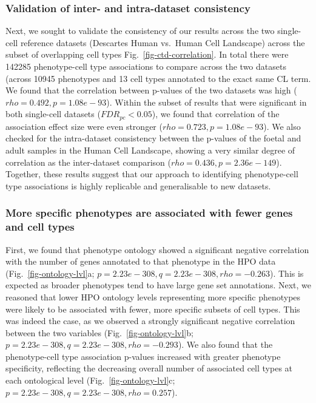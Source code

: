 \documentclass[
]{agujournal2019}
\begin{document}
\subsubsection{Validation of inter- and intra-dataset
consistency}\label{validation-of-inter--and-intra-dataset-consistency}

Next, we sought to validate the consistency of our results across the
two single-cell reference datasets (Descartes Human vs.~Human Cell
Landscape) across the subset of overlapping cell types
Fig.~\ref{fig-ctd-correlation}. In total there were 142285
phenotype-cell type associations to compare across the two datasets
(across 10945 phenotypes and 13 cell types annotated to the exact same
CL term. We found that the correlation between p-values of the two
datasets was high (\(rho=0.492, p=1.08e-93\)). Within the subset of
results that were significant in both single-cell datasets
(\(FDR_{pc}<0.05\)), we found that correlation of the association effect
size were even stronger (\(rho=0.723, p=1.08e-93\)). We also checked for
the intra-dataset consistency between the p-values of the foetal and
adult samples in the Human Cell Landscape, showing a very similar degree
of correlation as the inter-dataset comparison
(\(rho=0.436, p=2.36e-149\)). Together, these results suggest that our
approach to identifying phenotype-cell type associations is highly
replicable and generalisable to new datasets.

\subsubsection{More specific phenotypes are associated with fewer genes
and cell
types}\label{more-specific-phenotypes-are-associated-with-fewer-genes-and-cell-types}

First, we found that phenotype ontology showed a significant negative
correlation with the number of genes annotated to that phenotype in the
HPO data (Fig.~\ref{fig-ontology-lvl}a;
\(p=2.23e-308, q=2.23e-308, rho=-0.263\)). This is expected as broader
phenotypes tend to have large gene set annotations. Next, we reasoned
that lower HPO ontology levels representing more specific phenotypes
were likely to be associated with fewer, more specific subsets of cell
types. This was indeed the case, as we observed a strongly significant
negative correlation between the two variables
(Fig.~\ref{fig-ontology-lvl}b;
\(p=2.23e-308, q=2.23e-308, rho=-0.293\)). We also found that the
phenotype-cell type association p-values increased with greater
phenotype specificity, reflecting the decreasing overall number of
associated cell types at each ontological level
(Fig.~\ref{fig-ontology-lvl}c; \(p=2.23e-308, q=2.23e-308, rho=0.257\)).
\end{document}
